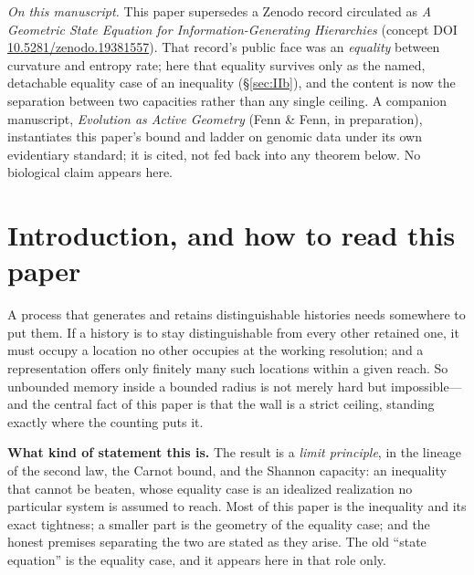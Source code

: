 \documentclass[11pt,reqno]{amsart}
\theoremstyle{plain}
\theoremstyle{definition}
\begin{document}
\maketitle

{\small\noindent\emph{On this manuscript.} This paper supersedes a Zenodo record circulated as \emph{A Geometric State Equation for Information-Generating Hierarchies} (concept DOI \href{https://doi.org/10.5281/zenodo.19381557}{10.5281/zenodo.19381557}). That record's public face was an \emph{equality} between curvature and entropy rate; here that equality survives only as the named, detachable equality case of an inequality (\S\ref{sec:IIb}), and the content is now the separation between two capacities rather than any single ceiling. A companion manuscript, \emph{Evolution as Active Geometry} (Fenn \& Fenn, in preparation), instantiates this paper's bound and ladder on genomic data under its own evidentiary standard; it is cited, not fed back into any theorem below. No biological claim appears here.\par}

\section{Introduction, and how to read this paper}

A process that generates and retains distinguishable histories needs somewhere to put them. If a history is to stay distinguishable from every other retained one, it must occupy a location no other occupies at the working resolution; and a representation offers only finitely many such locations within a given reach. So unbounded memory inside a bounded radius is not merely hard but impossible---and the central fact of this paper is that the wall is a strict ceiling, standing exactly where the counting puts it.

\medskip
\noindent\textbf{What kind of statement this is.} The result is a \emph{limit principle}, in the lineage of the second law, the Carnot bound, and the Shannon capacity: an inequality that cannot be beaten, whose equality case is an idealized realization no particular system is assumed to reach. Most of this paper is the inequality and its exact tightness; a smaller part is the geometry of the equality case; and the honest premises separating the two are stated as they arise. The old ``state equation'' is the equality case, and it appears here in that role only.
\end{document}

